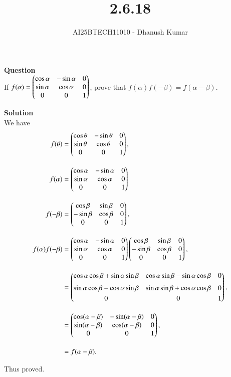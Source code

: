 \documentclass[journal]{IEEEtran}
\begin{document}
\title{2.6.18}
\author{AI25BTECH11010 - Dhanush Kumar}
\maketitle
\renewcommand{\thefigure}{\theenumi}
\renewcommand{\thetable}{\theenumi}

\noindent
\textbf{Question}\\
If $f(\alpha) = \begin{pmatrix}\cos\alpha & -\sin\alpha & 0 \\ \sin\alpha & \cos\alpha & 0 \\ 0 & 0 & 1\end{pmatrix}$,  
prove that $f(\alpha)f(-\beta) = f(\alpha-\beta)$.

\bigskip
\noindent

\textbf{Solution}\\

We have
\begin{align}
f(\theta) 
&= \begin{pmatrix}\cos\theta & -\sin\theta & 0 \\ \sin\theta & \cos\theta & 0 \\ 0 & 0 & 1\end{pmatrix}, \\[1em]
f(\alpha) 
	&= \begin{pmatrix}\cos\alpha & -\sin\alpha & 0 \\ \sin\alpha & \cos\alpha & 0 \\ 0 & 0 & 1\end{pmatrix}\\[1em]
f(-\beta) 
&= \begin{pmatrix}\cos\beta & \sin\beta & 0 \\ -\sin\beta & \cos\beta & 0 \\ 0 & 0 & 1\end{pmatrix}, \\[1em]
f(\alpha)f(-\beta) 
&= \begin{pmatrix}\cos\alpha & -\sin\alpha & 0 \\ \sin\alpha & \cos\alpha & 0 \\ 0 & 0 & 1\end{pmatrix}
   \begin{pmatrix}\cos\beta & \sin\beta & 0 \\ -\sin\beta & \cos\beta & 0 \\ 0 & 0 & 1\end{pmatrix}, \\[1em]
&= \begin{pmatrix}\cos\alpha\cos\beta + \sin\alpha\sin\beta & \cos\alpha\sin\beta - \sin\alpha\cos\beta & 0 \\[2mm]
          \sin\alpha\cos\beta - \cos\alpha\sin\beta & \sin\alpha\sin\beta + \cos\alpha\cos\beta & 0 \\[1mm]
          0 & 0 & 1\end{pmatrix}, \\[1em]
&= \begin{pmatrix}\cos(\alpha-\beta) & -\sin(\alpha-\beta) & 0 \\ \sin(\alpha-\beta) & \cos(\alpha-\beta) & 0 \\ 0 & 0 & 1\end{pmatrix}, \\[1em]
&= f(\alpha-\beta).
\end{align}

Thus proved.
\end{document}
